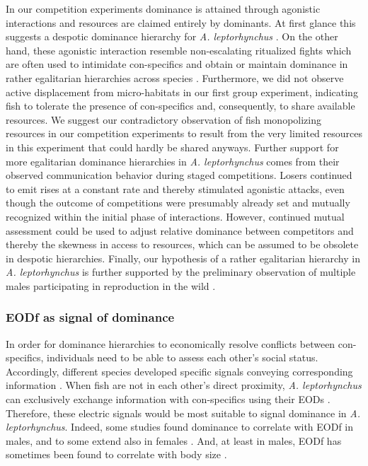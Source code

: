 \documentclass[11pt,pdftex]{article}
\newcommand{\lepto}{\textit{A. leptorhynchus}}
\begin{document}
In our competition experiments dominance is attained through agonistic interactions and resources are claimed entirely by dominants. At first glance this suggests a despotic dominance hierarchy for \lepto{} \citep{Kappeler2008}. On the other hand, these agonistic interaction resemble non-escalating ritualized fights \citep{Triefenbach2008} which are often used to intimidate con-specifics and obtain or maintain dominance in rather egalitarian hierarchies across species \citep{Sapolsky2005}. Furthermore, we did not observe active displacement from micro-habitats in our first group experiment, indicating fish to tolerate the presence of con-specifics and, consequently, to share available resources. We suggest our contradictory observation of fish monopolizing resources in our competition experiments to result from the very limited resources in this experiment that could hardly be shared anyways. Further support for more egalitarian dominance hierarchies in \lepto{} comes from their observed communication behavior during staged competitions. Losers continued to emit rises at a constant rate and thereby stimulated agonistic attacks, even though the outcome of competitions were presumably already set and mutually recognized within the initial phase of interactions. However, continued mutual assessment could be used to adjust relative dominance between competitors and thereby the skewness in access to resources, which can be assumed to be obsolete in despotic hierarchies. Finally, our hypothesis of a rather egalitarian hierarchy in \lepto{} is further supported by the preliminary observation of multiple males participating in reproduction in the wild \citep{Henninger2018}. 

\subsubsection{EODf as signal of dominance}

In order for dominance hierarchies to economically resolve conflicts between con-specifics, individuals need to be able to assess each other's social status. Accordingly, different species developed specific signals conveying corresponding information \citep{Cluttonbrock1979, Fernald2014, Cornhill2020}. When fish are not in each other's direct proximity, \lepto{} can exclusively exchange information with con-specifics using their EODs \citep{Knudsen1975, Henninger2018, Henninger2020, Benda2020}. Therefore, these electric signals would be most suitable to signal dominance in \lepto{}. Indeed, some studies found dominance to correlate with EODf in males, and to some extend also in females \citep{Hagedorn1985, Dunlap2002, Triefenbach2008}. And, at least in males, EODf has sometimes been found to correlate with body size \citep{Dunlap2002, Triefenbach2008}. 
\end{document}
